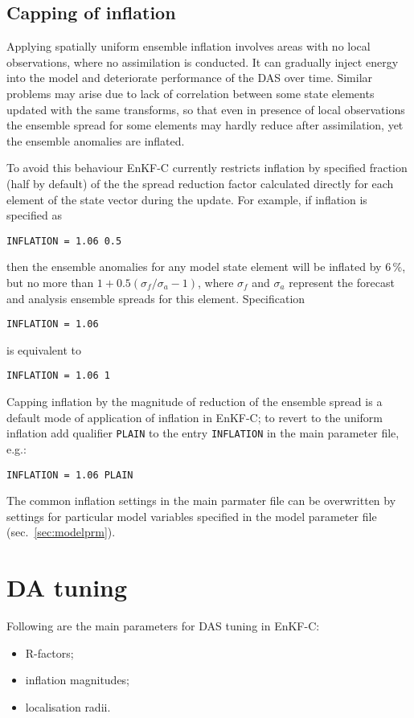 \documentclass[11pt]{report}
\begin{document}
\subsection{Capping of inflation}
\label{sec:capping}

Applying spatially uniform ensemble inflation involves areas with no local observations, where no assimilation is conducted.
It can gradually inject energy into the model and deteriorate performance of the DAS over time.
Similar problems may arise due to lack of correlation between some state elements updated with the same transforms, so that even in presence of local observations the ensemble spread for some elements may hardly reduce after assimilation, yet the ensemble anomalies are inflated.

To avoid this behaviour EnKF-C currently restricts inflation by specified fraction (half by default) of the the spread reduction factor calculated directly for each element of the state vector during the update.
For example, if inflation is specified as
\begin{Verbatim}
INFLATION = 1.06 0.5
\end{Verbatim}
then the ensemble anomalies for any model state element will be inflated by 6\,\%, but no more than $1 + 0.5 (\sigma_f / \sigma_a - 1)$, where $\sigma_f$ and $\sigma_a$ represent the forecast and analysis ensemble spreads for this element.
Specification
\begin{Verbatim}
INFLATION = 1.06
\end{Verbatim}
is equivalent to
\begin{Verbatim}
INFLATION = 1.06 1
\end{Verbatim}
Capping inflation by the magnitude of reduction of the ensemble spread is a default mode of application of inflation in EnKF-C; to revert to the uniform inflation add qualifier \verb|PLAIN| to the entry \verb|INFLATION| in the main parameter file, e.g.:
\begin{Verbatim}
INFLATION = 1.06 PLAIN
\end{Verbatim}
The common inflation settings in the main parmater file can be overwritten by settings for particular model variables specified in the model parameter file (sec.~\ref{sec:modelprm}).

\section{DA tuning}
\label{sec:datuning}

Following are the main parameters for DAS tuning in EnKF-C:
\begin{itemize}
\item R-factors;
\item inflation magnitudes;
\item localisation radii.
\end{itemize}
\end{document}
